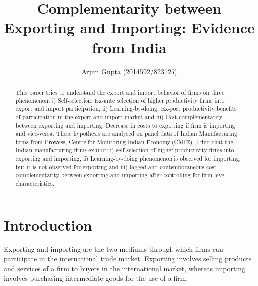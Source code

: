 \documentclass[12pt]{article}
\title{Complementarity between Exporting and Importing: Evidence from India}
\author{Arjun Gupta (2014592/823125)}
\begin{document}
\maketitle


\begin{abstract}
This paper tries to understand the export and import behavior of
firms on three phenomenon: i) Self-selection: Ex-ante selection of higher
productivity firms into export and import participation,
ii) Learning-by-doing: Ex-post productivity benefits of participation
in the export and import market and iii) Cost complementarity between exporting
and importing: Decrease in costs to exporting if firm is importing and
vice-versa. These hypothesis are analysed on panel data of Indian
Manufacturing firms from Prowess, Centre for Monitoring Indian Economy
(CMIE). I find that the Indian manufacturing firms exhibit: i) self-selection of higher productivity
firms into exporting and importing, ii) Learning-by-doing phenomenon
is observed for importing, but it is not observed for exporting and
iii) lagged and contemporaneous cost complementarity between exporting
and importing after controlling for firm-level characteristics.  
\end{abstract}
\bigskip



\newpage
\small

\tableofcontents

\newpage

\section{Introduction}\label{sec:introduction}

Exporting and importing are the two mediums through which firms can
participate in the international trade market. Exporting involves
selling products and services of a firm to buyers in the international
market, whereas importing involves purchasing intermediate goods for
the use of a firm.  
\end{document}
